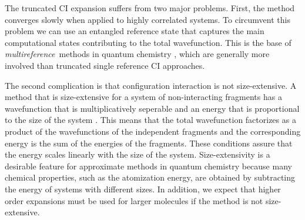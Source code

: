 \documentclass[superscriptaddress,aps,pra,twocolumn,nofootinbib,babel]{revtex4-1}
\begin{document}
The truncated CI expansion suffers from two major problems. First, the method converges slowly when applied to highly correlated systems. To circumvent this problem we can use an entangled reference state that captures the main computational states contributing to the total wavefunction. This is the base of  \emph{multireference}\ methods in quantum chemistry \cite{Helgaker2013,Szalay.CR.112.108.2011}, %
which are generally more involved than truncated single reference CI approaches.

The second complication is that configuration interaction is not size-extensive. A method that is size-extensive for a system of non-interacting fragments has a wavefunction that is multiplicatively seperable and an energy that is proportional to the size of the system \cite{Helgaker2013}. This means that the total wavefunction factorizes as a product of the wavefunctions of the independent fragments and the corresponding energy is the sum of the energies of the fragments. These conditions assure that the energy scales linearly with the size of the system. Size-extensivity is a desirable feature for approximate methods in quantum chemistry because many chemical properties, such as the atomization energy, are obtained by subtracting the energy of systems with different sizes. In addition, we expect that higher order expansions must be used for larger molecules if the method is not size-extensive.
\end{document}
